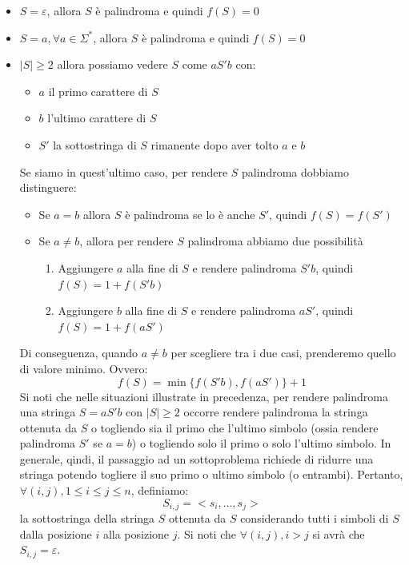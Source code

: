 \documentclass[12pt]{article}
\begin{document}
\begin{itemize}
    \item $S = \varepsilon$, allora $S$ è palindroma e quindi $f(S) = 0$
    \item $S = a, \forall a \in \Sigma^*$, allora $S$ è palindroma e quindi $f(S) = 0$
    \item $|S| \geq 2$ allora possiamo vedere $S$ come $a S' b$ con:
    \begin{itemize}
        \item $a$ il primo carattere di $S$
        \item $b$ l'ultimo carattere di $S$
        \item $S'$ la sottostringa di $S$ rimanente dopo aver tolto $a$ e $b$
    \end{itemize}
    Se siamo in quest'ultimo caso, per rendere $S$ palindroma dobbiamo distinguere:
    \begin{itemize}
        \item Se $a = b$ allora $S$ è palindroma se lo è anche $S'$, quindi $f(S) = f(S')$
        \item Se $a \neq b$, allora per rendere $S$ palindroma abbiamo due possibilità
        \begin{enumerate}
            \item Aggiungere $a$ alla fine di $S$ e rendere palindroma $S'b$, quindi $f(S) = 1 + f(S'b)$
            \item Aggiungere $b$ alla fine di $S$ e rendere palindroma $aS'$, quindi $f(S) = 1 + f(aS')$
        \end{enumerate}
    \end{itemize}
    Di conseguenza, quando $a \neq b$ per scegliere tra i due casi, prenderemo quello di valore minimo. Ovvero:
    $$f(S) = \min\{f(S'b), f(aS')\} + 1$$
    Si noti che nelle situazioni illustrate in precedenza, per rendere palindroma una stringa $S = aS'b$ con $|S| \geq 2$ occorre rendere palindroma la stringa ottenuta da $S$ o togliendo sia il primo che l'ultimo simbolo (ossia rendere palindroma $S'$ se $a = b$) o togliendo solo il primo o solo l'ultimo simbolo.
    In generale, qindi, il passaggio ad un sottoproblema richiede di ridurre una stringa potendo togliere il suo primo o ultimo simbolo (o entrambi). Pertanto, $\forall (i,j), 1 \leq i \leq j \leq n$, definiamo:
    $$S_{i,j} = <s_i, \dots, s_j>$$
    la sottostringa della stringa $S$ ottenuta da $S$ considerando tutti i simboli di $S$ dalla posizione $i$ alla posizione $j$. Si noti che $\forall (i,j), i > j$ si avrà che $S_{i,j} = \varepsilon$.
\end{itemize}
\end{document}
